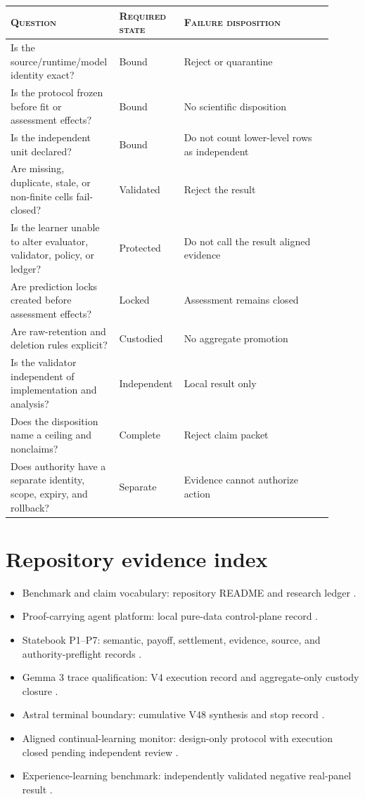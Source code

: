 \documentclass[11pt,twoside]{article}
\newcommand{\sourcecite}[1]{\parencite{#1}}
\begin{document}
\begin{longtable}{@{}P{0.28\linewidth}P{0.18\linewidth}P{0.45\linewidth}@{}}
\toprule
\textsc{Question} & \textsc{Required state} & \textsc{Failure disposition} \\
\midrule
\endhead
Is the source/runtime/model identity exact? & Bound & Reject or quarantine \\
Is the protocol frozen before fit or assessment effects? & Bound & No scientific disposition \\
Is the independent unit declared? & Bound & Do not count lower-level rows as independent \\
Are missing, duplicate, stale, or non-finite cells fail-closed? & Validated & Reject the result \\
Is the learner unable to alter evaluator, validator, policy, or ledger? & Protected & Do not call the result aligned evidence \\
Are prediction locks created before assessment effects? & Locked & Assessment remains closed \\
Are raw-retention and deletion rules explicit? & Custodied & No aggregate promotion \\
Is the validator independent of implementation and analysis? & Independent & Local result only \\
Does the disposition name a ceiling and nonclaims? & Complete & Reject claim packet \\
Does authority have a separate identity, scope, expiry, and rollback? & Separate & Evidence cannot authorize action \\
\bottomrule
\end{longtable}

\section{Repository evidence index}

\begin{itemize}[leftmargin=1.8em,itemsep=0.25em]
  \item Benchmark and claim vocabulary: repository README and research ledger \sourcecite{repoREADME2026}.
  \item Proof-carrying agent platform: local pure-data control-plane record \sourcecite{repoHSAI2026}.
  \item Statebook P1--P7: semantic, payoff, settlement, evidence, source, and authority-preflight records \sourcecite{repoStatebook2026}.
  \item Gemma 3 trace qualification: V4 execution record and aggregate-only custody closure \sourcecite{repoAstralV42026}.
  \item Astral terminal boundary: cumulative V48 synthesis and stop record \sourcecite{repoAstralV482026}.
  \item Aligned continual-learning monitor: design-only protocol with execution closed pending independent review \sourcecite{repoAHCL2026}.
  \item Experience-learning benchmark: independently validated negative real-panel result \sourcecite{repoOakLab2026}.
\end{itemize}
\end{document}

